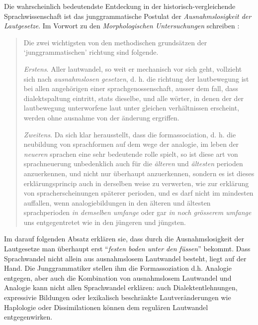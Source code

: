 \documentclass[12pt,a4paper,normalheadings]{scrartcl}
\begin{document}
Die wahrscheinlich bedeutendste Entdeckung
in der historisch-vergleichende Sprachwissenschaft ist
das junggrammatische Postulat der \emph{Ausnahmslosigkeit der Lautgesetze}.
Im Vorwort zu den \textit{Morphologischen Untersuchungen}
schreiben \textcite[XIII]{brugmann_osthoff}:

\begin{quote}
Die zwei wichtigsten von den methodischen grundsätzen der `junggrammatischen'
richtung sind folgende.

\emph{Erstens}. Aller lautwandel, so weit er mechanisch vor sich geht,
vollzieht sich nach \emph{ausnahmslosen gesetzen},
d. h. die richtung der lautbewegung ist bei allen angehörigen
einer sprachgenossenschaft, ausser dem fall, dass dialektspaltung
eintritt, stats dieselbe, und alle wörter, in denen der der
lautbewegung unterworfene laut unter gleichen verhältnissen erscheint,
werden ohne ausnahme von der änderung ergriffen.

\emph{Zweitens}. Da sich klar herausstellt,
dass die formassociation, d. h. die neubildung von sprachformen auf dem wege
der analogie, im leben der \emph{neueren}
sprachen eine sehr bedeutende rolle spielt,
so ist diese art von sprachneuerung unbedenklich auch für die \emph{älteren}
und \emph{ältesten} perioden anzuerkennen,
und nicht nur überhaupt anzuerkennen, sondern es ist dieses
erklärungsprincip auch in derselben weise zu verwerten,
wie zur erklärung von spracherscheinungen späterer perioden,
und es darf nicht im mindesten auffallen,
wenn analogiebildungen in den älteren und ältesten sprachperioden
\emph{in demselben umfange} oder gar \emph{in noch grösserem umfange}
uns entgegentretet wie in den jüngeren und jüngsten.
\end{quote}

Im darauf folgenden Absatz erklären sie,
dass durch die Ausnahmslosigkeit der Lautgesetze man überhaupt
erst ``\emph{festen boden unter den füssen}'' bekommt.
Dass Sprachwandel nicht allein aus ausnahmslosem Lautwandel besteht,
liegt auf der Hand.
Die Junggrammatiker stellen ihm die Formassoziation d.h. Analogie entgegen,
aber auch die Kombination von ausnahmslosem Lautwandel und Analogie kann nicht 
allen Sprachwandel erklären:
auch Dialektentlehnungen,
expressivie Bildungen
oder lexikalisch beschränkte Lautveränderungen
wie Haplologie oder Dissimilationen
können dem regulären Lautwandel entgegenwirken.
\end{document}
